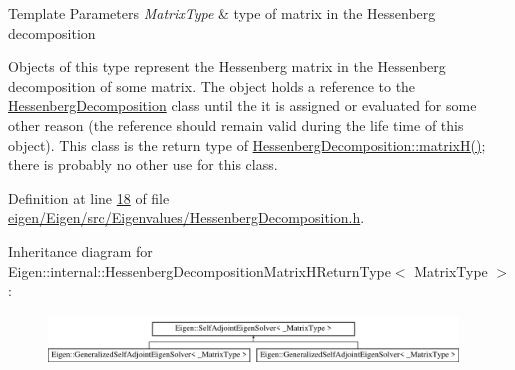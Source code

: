 \begin{DoxyTemplParams}{Template Parameters}
{\em Matrix\+Type} & type of matrix in the Hessenberg decomposition\\
\hline
\end{DoxyTemplParams}
Objects of this type represent the Hessenberg matrix in the Hessenberg decomposition of some matrix. The object holds a reference to the \hyperlink{group___eigenvalues___module_class_eigen_1_1_hessenberg_decomposition}{Hessenberg\+Decomposition} class until the it is assigned or evaluated for some other reason (the reference should remain valid during the life time of this object). This class is the return type of \hyperlink{group___eigenvalues___module_a8e781d2e22a2304647bcf0ae913cc8ea}{Hessenberg\+Decomposition\+::matrix\+H()}; there is probably no other use for this class. 

Definition at line \hyperlink{eigen_2_eigen_2src_2_eigenvalues_2_hessenberg_decomposition_8h_source_l00018}{18} of file \hyperlink{eigen_2_eigen_2src_2_eigenvalues_2_hessenberg_decomposition_8h_source}{eigen/\+Eigen/src/\+Eigenvalues/\+Hessenberg\+Decomposition.\+h}.

Inheritance diagram for Eigen\+:\+:internal\+:\+:Hessenberg\+Decomposition\+Matrix\+H\+Return\+Type$<$ Matrix\+Type $>$\+:\begin{figure}[H]
\begin{center}
\leavevmode
\includegraphics[height=1.253731cm]{group___eigenvalues___module}
\end{center}
\end{figure}
